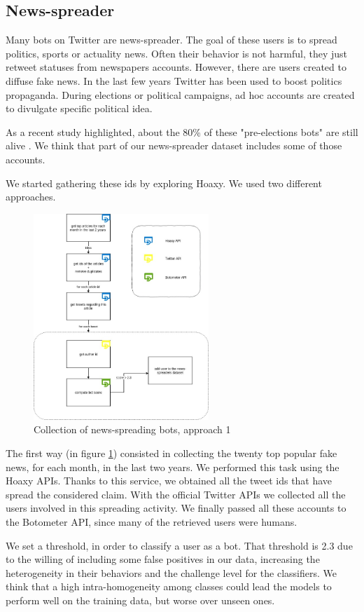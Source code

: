 \subsection{News-spreader}
Many bots on Twitter are news-spreader. The goal of these users is to spread politics, sports or actuality news. Often their behavior is not harmful, they just retweet statuses from newspapers accounts. However, there are users created to diffuse fake news. In the last few years Twitter has been used to boost politics propaganda. During elections or political campaigns, ad hoc accounts are created to divulgate specific political idea.

As a recent study highlighted, about the 80\% of these "pre-elections bots" are still alive \cite{Disinformation}. We think that part of our news-spreader dataset includes some of those accounts.

We started gathering these ids by exploring Hoaxy.
We used two different approaches.
\begin{figure}
	\centering
	\includegraphics[width=250px]{chapter3/figure/news-spreader.jpg}
	\caption{Collection of news-spreading bots, approach 1}
	\label{fig:news-spreaders}
\end{figure}
The first way (in figure \ref{fig:news-spreaders}) consisted in collecting the twenty top popular fake news, for each month, in the last two years. We performed this task using the Hoaxy APIs. Thanks to this service, we obtained all the tweet ids that have spread the considered claim. With the official Twitter APIs we collected all the users involved in this spreading activity. We finally passed all these accounts to the Botometer API, since many of the retrieved users were humans.

We set a threshold, in order to classify a user as a bot. That threshold is 2.3 due to the willing of including some false positives in our data, increasing the heterogeneity in their behaviors and the challenge level for the classifiers. We think that a high intra-homogeneity among classes could lead the models to perform well on the training data, but worse over unseen ones.

